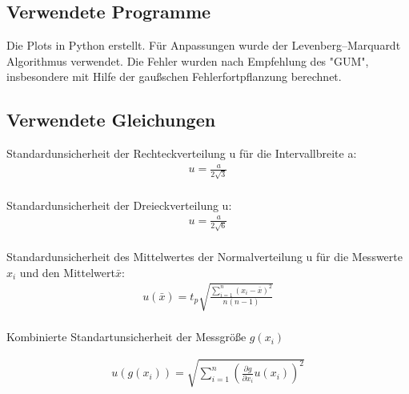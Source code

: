 \subsection{Verwendete Programme}
Die Plots in Python erstellt. Für Anpassungen wurde der  Levenberg–Marquardt Algorithmus verwendet. Die Fehler wurden nach Empfehlung des "GUM", insbesondere mit Hilfe der gaußschen Fehlerfortpflanzung berechnet.

\subsection{Verwendete Gleichungen}\label{VGuD}









Standardunsicherheit der Rechteckverteilung u für die Intervallbreite a:
\begin{align}
	u=\frac{a}{2\sqrt{3}}\label{eq:sur}
\end{align} \\
Standardunsicherheit der Dreieckverteilung u: \begin{align}
	u=\frac{a}{2\sqrt{6}}\label{eq:sud}
\end{align}\\
Standardunsicherheit des Mittelwertes der Normalverteilung u für die Messwerte $x_i$ und den Mittelwert$\bar{x}$:
\begin{align}
	u(\bar{x})=  t_p  \sqrt{  \frac{\sum_{i=1}^{n}  (x_i-\bar{x})^2} {n (n-1)} }
	\label{eq:sunv}       
\end{align} \\
Kombinierte Standartunsicherheit der Messgröße $g(x_i)$

\begin{align}
	u(g(x_i))=   \sqrt{  \sum_{i=1}^{n} \left( \frac{\partial g}{\partial x_i} u(x_i) \right)^2  }
	\label{eq:kombsu}       
\end{align}\\

